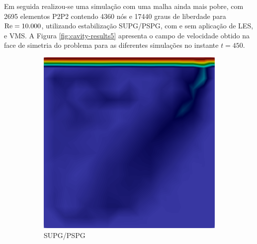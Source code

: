 Em seguida realizou-se uma simulação com uma malha ainda mais pobre, com 2695 elementos P2P2 contendo 4360 nós e 17440 graus de liberdade para $\mathrm{Re}=10.000$, utilizando estabilização SUPG/PSPG, com e sem aplicação de LES, e VMS. A Figura \ref{fig:cavity-results5} apresenta o campo de velocidade obtido na face de simetria do problema para as diferentes simulações no instante $t=450$.

\begin{figure}[h!]
    \centering
    \caption{Cavidade tridimensional - Campo de velocidade na face de simetria.}
    \begin{subfigure}{0.32\textwidth}
        \centering
        \includegraphics[width=\linewidth]{Figuras/cavity3D/DNS.png}
        \caption{SUPG/PSPG}
    \end{subfigure}
    \begin{subfigure}{0.32\textwidth}
        \centering

\end{subfigure}
\end{figure}
